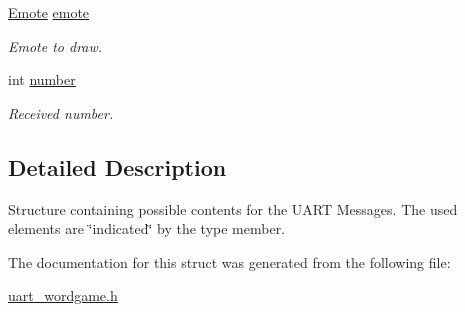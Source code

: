 \begin{DoxyCompactItemize}
\mbox{\hyperlink{group__emote_ga0e527855c554e31654c9beb340145574}{Emote}} \mbox{\hyperlink{group__uart__wordgame_ga91fba59102bf481eb5326e7ea57d1a2e}{emote}}
\begin{DoxyCompactList}\small\item\em Emote to draw. \end{DoxyCompactList}\item 
int \mbox{\hyperlink{group__uart__wordgame_gab03c4fe8fde542d8614dcafe1789ac44}{number}}
\begin{DoxyCompactList}\small\item\em Received number. \end{DoxyCompactList}\end{DoxyCompactItemize}


\subsection{Detailed Description}
Structure containing possible contents for the U\+A\+RT Messages. The used elements are \char`\"{}indicated\char`\"{} by the type member. 

The documentation for this struct was generated from the following file\+:\begin{DoxyCompactItemize}
\item 
\mbox{\hyperlink{uart__wordgame_8h}{uart\+\_\+wordgame.\+h}}\end{DoxyCompactItemize}
